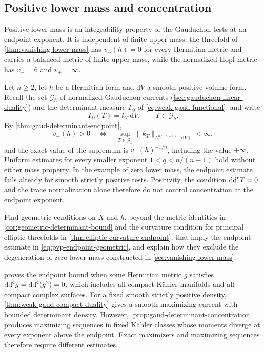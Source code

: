 \subsection{Positive lower mass and concentration}

Positive lower mass is an integrability property of the Gauduchon tests at an endpoint exponent. It is independent of finite upper mass: the threefold of \cref{thm:vanishing-lower-mass} has $v_-(h)=0$ for every Hermitian metric and carries a balanced metric of finite upper mass, while the normalized Hopf metric has $v_-=6$ and $v_+=\infty$.

Let $n\geq2$, let $h$ be a Hermitian form and $\mathrm{d}V$ a smooth positive volume form. Recall the set $\mathscr G_h$ of normalized Gauduchon currents (\cref{sec:gauduchon-linear-duality}) and the determinant measure $\Gamma_0$ of \eqref{eq:weak-gaud-functional}, and write
\[
 \Gamma_0(T)=k_T\,\mathrm{d}V,\qquad T\in\mathscr G_h.
\]
By \cref{thm:gaud-determinant-endpoint},
\begin{equation}\label{eq:pvp-endpoint-geometric}
 v_-(h)>0
 \quad\Longleftrightarrow\quad
 \sup_{T\in\mathscr G_h}
       \|k_T\|_{L^{n/(n-1)}(\mathrm{d}V)}<\infty,
\end{equation}
and the exact value of the supremum is $v_-(h)^{-1/n}$, including the value $+\infty$. Uniform estimates for every smaller exponent $1<q<n/(n-1)$ hold without either mass property. In the example of zero lower mass, the endpoint estimate fails already for smooth strictly positive tests. Positivity, the condition $\mathrm{dd}^{\mathrm{c}} T=0$ and the trace normalization alone therefore do not control concentration at the endpoint exponent.

\begin{problem}\label{qu:geometric-gaud-endpoint}
Find geometric conditions on $X$ and $h$, beyond the metric identities in \cref{cor:geometric-determinant-bound} and the curvature condition for principal elliptic threefolds in \cref{thm:elliptic-curvature-endpoint}, that imply the endpoint estimate in \eqref{eq:pvp-endpoint-geometric}, and explain how they exclude the degeneration of zero lower mass constructed in \cref{sec:vanishing-lower-mass}.
\end{problem}

 proves the endpoint bound when some Hermitian metric $g$ satisfies $\mathrm{dd}^{\mathrm{c}} g=\mathrm{dd}^{\mathrm{c}}(g^2)=0$, which includes all compact K\"ahler manifolds and all compact complex surfaces. For a fixed smooth strictly positive density, \cref{thm:weak-gaud-compact-duality} gives a smooth maximizing current with bounded determinant density. However, \cref{prop:gaud-determinant-concentration} produces maximizing sequences in fixed K\"ahler classes whose moments diverge at every exponent above the endpoint. Exact maximizers and maximizing sequences therefore require different estimates.

